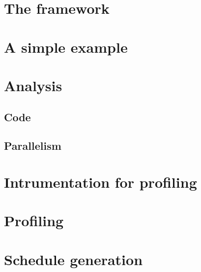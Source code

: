\documentclass[a4paper,11pt,oneside]{book}
\begin{document}
\section{The framework}
\section{A simple example}
\section{Analysis}
\subsection{Code}
\subsection{Parallelism}
\section{Intrumentation for profiling}
\section{Profiling}
\section{Schedule generation}
\end{document}
